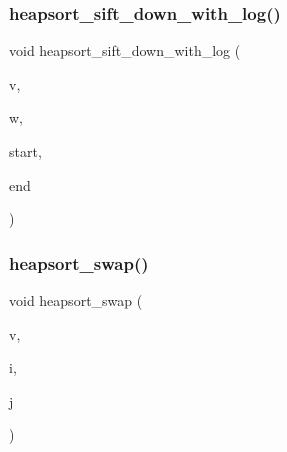 \mbox{\label{sorting_8_c_ac7af225fae479a93d6957f79734ba2a6}} 
\subsubsection{\texorpdfstring{heapsort\+\_\+sift\+\_\+down\+\_\+with\+\_\+log()}{heapsort\_sift\_down\_with\_log()}}
{\footnotesize\ttfamily void heapsort\+\_\+sift\+\_\+down\+\_\+with\+\_\+log (\begin{DoxyParamCaption}\item[{\mbox{\hyperlink{galois_8h_a09fddde158a3a20bd2dcadb609de11dc}{I\+NT}} $\ast$}]{v,  }\item[{\mbox{\hyperlink{galois_8h_a09fddde158a3a20bd2dcadb609de11dc}{I\+NT}} $\ast$}]{w,  }\item[{\mbox{\hyperlink{galois_8h_a09fddde158a3a20bd2dcadb609de11dc}{I\+NT}}}]{start,  }\item[{\mbox{\hyperlink{galois_8h_a09fddde158a3a20bd2dcadb609de11dc}{I\+NT}}}]{end }\end{DoxyParamCaption})}

\mbox{\label{sorting_8_c_a8f048362e6065297b19b6975bcbbfcc6}} 
\subsubsection{\texorpdfstring{heapsort\+\_\+swap()}{heapsort\_swap()}}
{\footnotesize\ttfamily void heapsort\+\_\+swap (\begin{DoxyParamCaption}\item[{\mbox{\hyperlink{galois_8h_a09fddde158a3a20bd2dcadb609de11dc}{I\+NT}} $\ast$}]{v,  }\item[{\mbox{\hyperlink{galois_8h_a09fddde158a3a20bd2dcadb609de11dc}{I\+NT}}}]{i,  }\item[{\mbox{\hyperlink{galois_8h_a09fddde158a3a20bd2dcadb609de11dc}{I\+NT}}}]{j }\end{DoxyParamCaption})}

\mbox{\label{sorting_8_c_a7d47ff5b6218622f072ca38a87900496}} 
